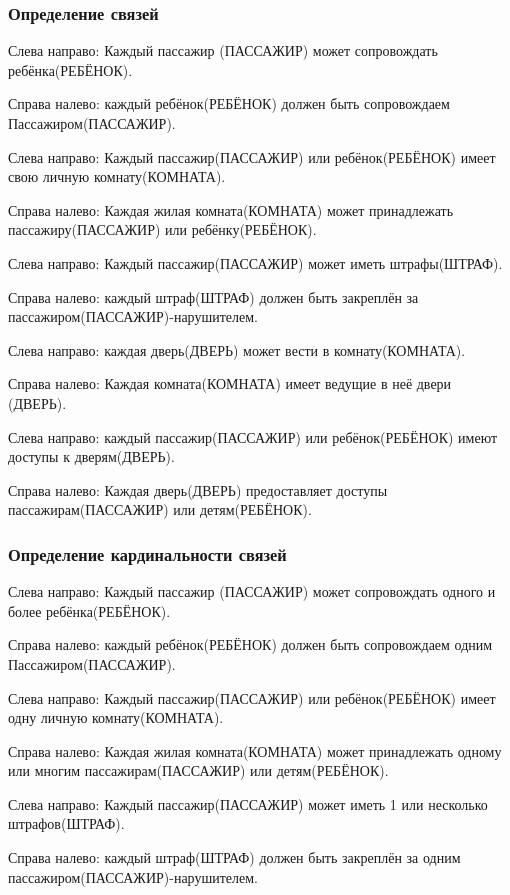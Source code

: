 \subsubsection{Определение связей}

Слева направо: Каждый пассажир (ПАССАЖИР) может сопровождать ребёнка(РЕБЁНОК).

Справа налево: каждый ребёнок(РЕБЁНОК) должен быть сопровождаем Пассажиром(ПАССАЖИР).

Слева направо: Каждый пассажир(ПАССАЖИР) или ребёнок(РЕБЁНОК) имеет свою личную комнату(КОМНАТА).

Справа налево: Каждая жилая комната(КОМНАТА) может принадлежать пассажиру(ПАССАЖИР) или ребёнку(РЕБЁНОК). 

Слева направо: Каждый пассажир(ПАССАЖИР) может иметь штрафы(ШТРАФ).

Справа налево: каждый штраф(ШТРАФ) должен быть закреплён за  пассажиром(ПАССАЖИР)-нарушителем.

Слева направо: каждая дверь(ДВЕРЬ) может вести в комнату(КОМНАТА).

Справа налево: Каждая комната(КОМНАТА) имеет ведущие в неё двери (ДВЕРЬ).

Слева направо: каждый пассажир(ПАССАЖИР) или ребёнок(РЕБЁНОК) имеют доступы к дверям(ДВЕРЬ).

Справа налево: Каждая дверь(ДВЕРЬ) предоставляет доступы пассажирам(ПАССАЖИР) или детям(РЕБЁНОК).

\subsubsection{Определение кардинальности связей}

Слева направо: Каждый пассажир (ПАССАЖИР) может сопровождать одного и более ребёнка(РЕБЁНОК).

Справа налево: каждый ребёнок(РЕБЁНОК) должен быть сопровождаем одним Пассажиром(ПАССАЖИР).

Слева направо: Каждый пассажир(ПАССАЖИР) или ребёнок(РЕБЁНОК) имеет одну личную комнату(КОМНАТА).

Справа налево: Каждая жилая комната(КОМНАТА) может принадлежать одному или многим пассажирам(ПАССАЖИР) или детям(РЕБЁНОК).

Слева направо: Каждый пассажир(ПАССАЖИР) может иметь 1 или несколько штрафов(ШТРАФ).

Справа налево: каждый штраф(ШТРАФ) должен быть закреплён за одним пассажиром(ПАССАЖИР)-нарушителем.

